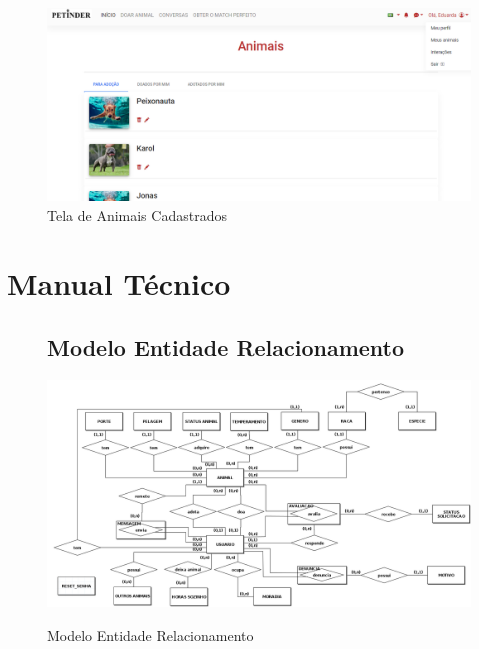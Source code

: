 \begin{apendicesenv}
\begin{flushleft}
\begin{figure}[!htbp]
    \centering
    \caption{\label{Animais}Tela de Animais Cadastrados}
	\includegraphics[scale=0.50,angle=0]{imagens/TelaAnimais.png}
\end{figure}

\end{flushleft}

\label{manul-usuario}

\chapter{Manual Técnico}
\label{manual-tecnico}
\begin{figure}[!htbp]
\begin{flushleft}
    \section{Modelo Entidade Relacionamento}
\end{flushleft}
    \centering
    \caption{Modelo Entidade Relacionamento}
    \includegraphics[scale=0.37,angle=90]{imagens/MODELOCONCEITUAL.png}
    \label{mer-tec}
\end{figure}


\end{apendicesenv}
